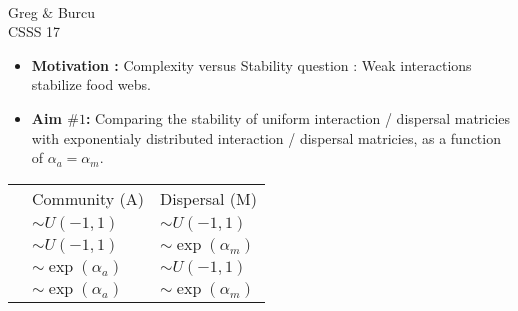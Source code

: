 \documentclass[12pt]{article}
\date{}
\begin{document}
\vspace*{0.2in}
\begin{flushleft}
{\Large
\textbf{} }
\newline
\\
Greg $\&$ Burcu
\\
\bigskip
CSSS 17
\\
\bigskip
\end{flushleft}

\begin{itemize}

\item \textbf{Motivation : } Complexity versus Stability question : Weak interactions stabilize food webs.
\item \textbf{Aim $\#1$: } Comparing the stability of uniform interaction / dispersal matricies with exponentialy distributed interaction / dispersal matricies, as a function of $\alpha_a = \alpha_m$.
\end{itemize}
\begin{table}[!h]
\centering
\begin{tabular}{lll}
 & Community (A) & Dispersal (M)  \\
 & $\sim U(-1,1)$ & $\sim U(-1,1)$  \\
 & $\sim U(-1,1)$ & $\sim \exp(\alpha_m)$  \\
 & $\sim \exp(\alpha_a)$ & $\sim U(-1,1)$  \\
 & $\sim \exp(\alpha_a)$ & $\sim \exp(\alpha_m)$
\end{tabular}
\end{table}
\end{document}
